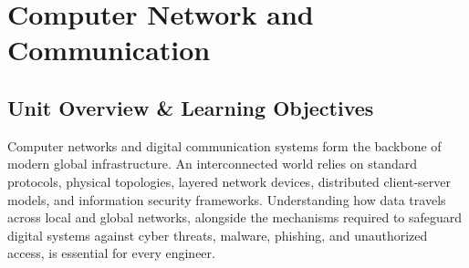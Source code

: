 \chapter{Computer Network and Communication}
\label{chap:computer-network-and-communication}

\section{Unit Overview \& Learning Objectives}

Computer networks and digital communication systems form the backbone of modern global infrastructure. An interconnected world relies on standard protocols, physical topologies, layered network devices, distributed client-server models, and information security frameworks. Understanding how data travels across local and global networks, alongside the mechanisms required to safeguard digital systems against cyber threats, malware, phishing, and unauthorized access, is essential for every engineer.

